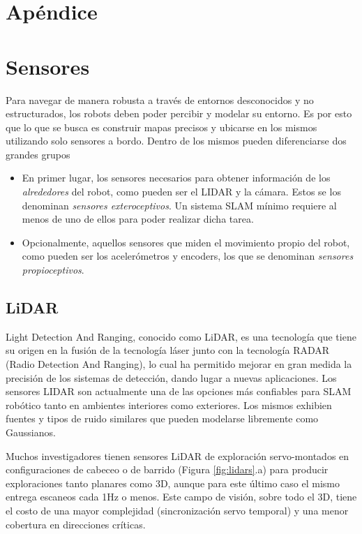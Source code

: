 \ifimagenes
\section*{Apéndice}
\else
\section{Sensores}
\label{sec:sensors}
\fi
Para navegar de manera robusta a través de entornos desconocidos y no estructurados, los robots deben poder percibir y modelar su entorno. Es por esto que lo que se busca es construir mapas precisos y ubicarse en los mismos utilizando solo sensores a bordo. Dentro de los mismos pueden diferenciarse dos grandes grupos
\begin{itemize}
    \item En primer lugar, los sensores necesarios para obtener información de los \textit{alrededores} del robot, como pueden ser el LIDAR y la cámara. Estos se los denominan \textit{sensores exteroceptivos}. Un sistema SLAM mínimo requiere al menos de uno de ellos para poder realizar dicha tarea.
    \item Opcionalmente, aquellos sensores que miden el movimiento propio del robot, como pueden ser los acelerómetros y encoders, los que se denominan \textit{sensores propioceptivos}.
\end{itemize}

\ifimagenes
\else
\subsection{LiDAR}
Light Detection And Ranging, conocido como LiDAR, es una tecnología que tiene su origen en la fusión de la tecnología láser junto con la tecnología RADAR (Radio Detection And Ranging), lo cual ha permitido mejorar en gran medida la precisión de los sistemas de detección, dando lugar a nuevas aplicaciones. Los sensores LIDAR son actualmente una de las opciones más confiables para SLAM robótico tanto en ambientes interiores como exteriores. Los mismos exhibien fuentes y tipos de ruido similares que pueden modelarse libremente como Gaussianos\cite{pomerleau2012}.

Muchos investigadores tienen sensores LiDAR de exploración servo-montados en configuraciones de cabeceo\cite{newman2006}\cite{pfingsthorn2013} o de barrido\cite{bosse2009} (Figura \ref{fig:lidars}.a) para producir exploraciones tanto planares como 3D, aunque para este último caso el mismo entrega escaneos cada 1Hz o menos. Este campo de visión, sobre todo el 3D, tiene el costo de una mayor complejidad (sincronización servo temporal) y una menor cobertura en direcciones críticas.

